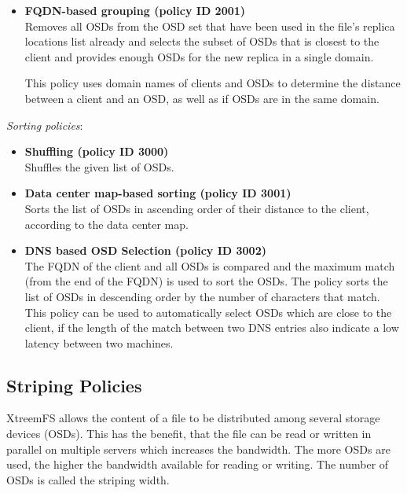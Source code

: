 \documentclass[a4paper,10pt]{book}
\begin{document}
\begin{itemize}
 \item \textbf{FQDN-based grouping (policy ID 2001)}\\
 Removes all OSDs from the OSD set that have been used in the file's replica locations list already and selects the subset of OSDs that is closest to the client and provides enough OSDs for the new replica in a single domain.

This policy uses domain names of clients and OSDs to determine the distance between a client and an OSD, as well as if OSDs are in the same domain.

\end{itemize}

\emph{Sorting policies}:

\begin{itemize}

 \item \textbf{Shuffling (policy ID 3000)}\\
 Shuffles the given list of OSDs.

 \item \textbf{Data center map-based sorting (policy ID 3001)}\\
 Sorts the list of OSDs in ascending order of their distance to the client, according to the data center map.

 \item \textbf{DNS based OSD Selection (policy ID 3002)}\\
 The FQDN of the client and all OSDs is compared and the maximum match (from the end of the FQDN) is used to sort the OSDs. The policy sorts the list of OSDs in descending order by the number of characters that match. This policy can be used to automatically select OSDs which are close to the client, if the length of the match between two DNS entries also indicate a low latency between two machines.

\end{itemize}

\subsection{Striping Policies} \label{sec:striping_policies}

XtreemFS allows the content of a file to be distributed among several storage devices (OSDs). This has the benefit, that the file can be read or written in parallel on multiple servers which increases the bandwidth. The more OSDs are used, the higher the bandwidth available for reading or writing. The number of OSDs is called the striping width.
\end{document}

